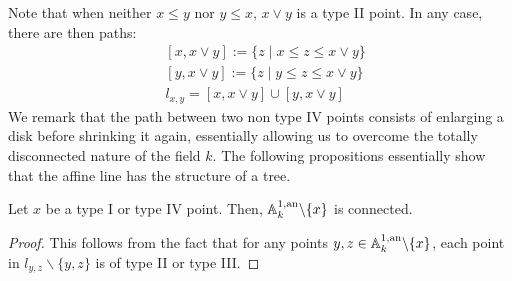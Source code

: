 Note that when neither $x \leq y$ nor $y \leq x$, $x \lor y$ is a type II point. In any case, there are then paths:
\begin{align*}
    & [x, x \lor y] := \{ z \; | \; x \leq z \leq x \lor y \} \\
    & [y, x \lor y] := \{ z \; | \; y \leq z \leq x \lor y \} \\
    & l_{x, y} = [x, x \lor y] \cup [y, x \lor y]
\end{align*}
We remark that the path between two non type IV points consists of enlarging a disk before shrinking it again, essentially allowing us to overcome the totally disconnected nature of the field $k$. The following propositions essentially show that the affine line has the structure of a tree.

\begin{prop}\parencite[\S 4.2]{berk1}
    Let $x$ be a type I or type IV point. Then, $\mathbb{A}^{1, \text{an}}_{k} \backslash \{x\}$ is connected.
\end{prop}
\begin{proof}
    This follows from the fact that for any points $y, z \in \mathbb{A}^{1, \text{an}}_{k} \backslash \{x\}$, each point in $l_{y, z} \backslash \{y, z\}$ is of type II or type III.
\end{proof}

